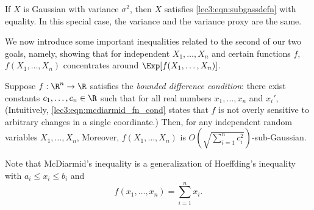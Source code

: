 \begin{example}
If $X$ is Gaussian with variance $\sigma^2$, then $X$ satisfies \eqref{lec3:eqn:subgassdefn} with equality. In this special case, the variance and the variance proxy are the same.
\end{example}

We now introduce some important inequalities related to the second of our two goals, namely, showing that for independent $X_1, \dotsc, X_n$ and certain functions $f$, $f(X_1, \dotsc, X_n)$ concentrates around $\Exp[f(X_1, \dotsc, X_n)]$.

\begin{theorem}
    Suppose $f : \R^n \to \R$ satisfies the \emph{bounded difference condition}: there exist constants $c_1, \ldots, c_n \in \R$ such that for all real numbers $x_1, \ldots, x_n$ and $x_i'$,
    (Intuitively, \eqref{lec3:eqn:mcdiarmid_fn_cond} states that $f$ is not overly sensitive to arbitrary changes in a single coordinate.) Then, for any independent random variables $X_1, \ldots, X_n$,
    Moreover, $f(X_1, \ldots, X_n)$ is $O\left(\sqrt{\sum_{i = 1}^n c_i^2}\right)$-sub-Gaussian.
\end{theorem}

\begin{remark}
    Note that McDiarmid's inequality is a generalization of Hoeffding's inequality with $a_i \leq x_i \leq b_i$ and
    \begin{equation}
        f(x_1, \dotsc, x_n) = \sum_{i = 1}^n x_i.
    \end{equation} 
\end{remark}

